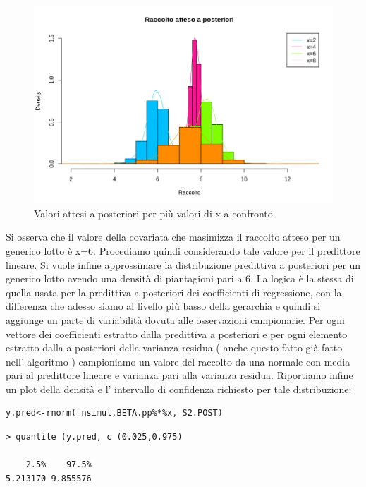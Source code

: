 \begin{figure}
    \centering
    \includegraphics[totalheight=8cm]{img/esercizio11-2-5.png}
    \caption{  Valori attesi a posteriori per più valori di x a confronto.}
\end{figure}

Si osserva che il valore della covariata che masimizza il raccolto atteso per un 
generico lotto è x=6. Procediamo quindi considerando tale valore per il predittore 
lineare. Si vuole infine approssimare la distribuzione predittiva a posteriori per 
un generico lotto avendo una densità di piantagioni pari a 6. La logica è la stessa 
di quella usata per la predittiva a posteriori dei coefficienti di regressione, con 
la differenza che adesso siamo al livello più basso della gerarchia e quindi si 
aggiunge un parte di variabilità dovuta alle osservazioni campionarie. 
Per ogni vettore dei coefficienti estratto dalla predittiva a posteriori e per ogni 
elemento estratto dalla a posteriori della varianza residua ( anche questo fatto già 
fatto nell' algoritmo ) campioniamo un valore del raccolto da una normale con 
media pari al predittore lineare e varianza pari alla varianza residua. 
Riportiamo infine un plot della densità e l' intervallo di confidenza richiesto per 
tale distribuzione:

\begin{lstlisting}[style=R]
y.pred<-rnorm( nsimul,BETA.pp%*%x, S2.POST)
\end{lstlisting}

{
\color{red}
\begin{Verbatim}
> quantile (y.pred, c (0.025,0.975) 

    2.5%    97.5%
5.213170 9.855576
\end{Verbatim}
}

